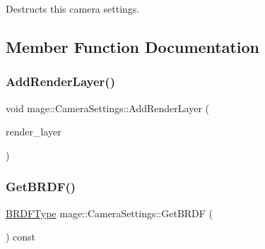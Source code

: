 Destructs this camera settings. 

\subsection{Member Function Documentation}
\hypertarget{structmage_1_1_camera_settings_ab1dca8b8f52daf55614592e0bb640ae9}{}\label{structmage_1_1_camera_settings_ab1dca8b8f52daf55614592e0bb640ae9} 
\subsubsection{\texorpdfstring{Add\+Render\+Layer()}{AddRenderLayer()}}
{\footnotesize\ttfamily void mage\+::\+Camera\+Settings\+::\+Add\+Render\+Layer (\begin{DoxyParamCaption}\item[{\hyperlink{namespacemage_a8b4a82582105b0299e2c2be5af7255d6}{Render\+Layer}}]{render\+\_\+layer }\end{DoxyParamCaption})\hspace{0.3cm}{\ttfamily [noexcept]}}

\hypertarget{structmage_1_1_camera_settings_a31504f7e9b23404ee1b200561b8dd789}{}\label{structmage_1_1_camera_settings_a31504f7e9b23404ee1b200561b8dd789} 
\subsubsection{\texorpdfstring{Get\+B\+R\+D\+F()}{GetBRDF()}}
{\footnotesize\ttfamily \hyperlink{namespacemage_ae7a7a03a7b34d7e2689689bb8295cd38}{B\+R\+D\+F\+Type} mage\+::\+Camera\+Settings\+::\+Get\+B\+R\+DF (\begin{DoxyParamCaption}{ }\end{DoxyParamCaption}) const\hspace{0.3cm}{\ttfamily [noexcept]}}

\hypertarget{structmage_1_1_camera_settings_a6673291bcfed8fa2c0a0041bf8f97f24}{}\label{structmage_1_1_camera_settings_a6673291bcfed8fa2c0a0041bf8f97f24} 
